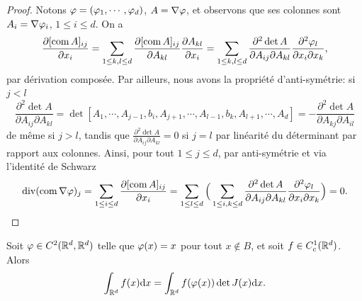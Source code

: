 \begin{proof}
	Notons $\varphi = (\varphi_1,\cdots,\varphi_d)$, $A = \nabla \varphi$, et observons que ses colonnes sont $A_i = \nabla \varphi_i$, $1 \leq i \leq d$. On a
	\begin{equation*}
		\frac{\partial [\operatorname{com} A]_{ij}}{\partial x_i} 
		= \sum_{1 \leq k,l \leq d} 
		\frac{\partial [\operatorname{com} A]_{ij}}{\partial A_{kl}} 
		\frac {\partial A_{kl}}{\partial x_i} 
		= \sum_{1 \leq k,l \leq d} 
		\frac{\partial^2 \det A}{\partial A_{ij} \partial A_{kl}} 
		\frac {\partial^2 \varphi_l}{\partial x_i \partial x_k},
	\end{equation*}
par dérivation composée. Par ailleurs, nous avons la propriété d'anti-symétrie: si $j<l$
\begin{equation*}
	\frac{\partial^2 \det A}{\partial A_{ij} \partial A_{kl}} 
	= \det [A_1,\cdots,A_{j-1}, b_i, A_{j+1}, \cdots, A_{l-1}, b_k, A_{l+1}, \cdots, A_d] 
	= - \frac{\partial^2 \det A}{\partial A_{kj} \partial A_{il}}
\end{equation*}
de même si $j>l$, tandis que $\frac{\partial^2 \det A}{\partial A_{ij} \partial A_{kl}} = 0$ si $j=l$ par linéarité du déterminant par rapport aux colonnes. Ainsi, pour tout $1 \leq j \leq d$, par anti-symétrie et via l'identité de Schwarz
\begin{equation*}
\operatorname{div}(\operatorname{com} \nabla \varphi)_j 
= \sum_{1 \leq i \leq d}
\frac{\partial [\operatorname{com} A]_{ij}}{\partial x_i} 
= \sum_{1 \leq l \leq d} \Big(\sum_{1 \leq i,k \leq d} 
\frac{\partial^2 \det A}{\partial A_{ij} \partial A_{kl}} 
\frac {\partial^2 \varphi_l}{\partial x_i \partial x_k}\Big) = 0.
\qedhere
\end{equation*}
\end{proof}

\begin{lemma}[Lax]
\label{lem:chgVarLax}
%
Soit $\varphi \in C^2(\mathbb{R}^d,\mathbb{R}^d)$ telle que $\varphi(x) = x$ pour tout $x \notin B$, et soit $f \in C^1_c(\mathbb{R}^d)$. Alors 
	\begin{equation}		
	\label{eq:chgmt_var_nondiff}
		\int_{\mathbb{R}^d} f(x) \mathrm{d} x = \int_{\mathbb{R}^d} f(\varphi(x)) \det J(x) \mathrm{d} x.
	\end{equation}
\end{lemma}

